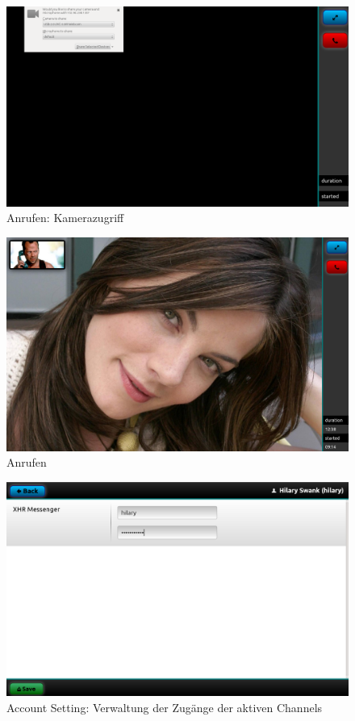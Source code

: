 	\begin{figure}[H]
		\centering
		\includegraphics[height=0.4\textheight]{../ui/img/finalUi/cameraAccess.png}
		\caption[Camera access screen]{Anrufen: Kamerazugriff}
		\label{phone screen camera access}
	\end{figure}
	\begin{figure}[H]
		\centering
		\includegraphics[height=0.4\textheight]{../ui/img/finalUi/phoneView.png}
		\caption[Call screen]{Anrufen}
		\label{phone screen}
	\end{figure}
	\begin{figure}[H]
		\centering
		\includegraphics[height=0.4\textheight]{../ui/img/finalUi/accountEditView.png}
		\caption[Channel edit screen]{Account Setting: Verwaltung der Zugänge der aktiven Channels}
		\label{account edit screen}
	\end{figure}